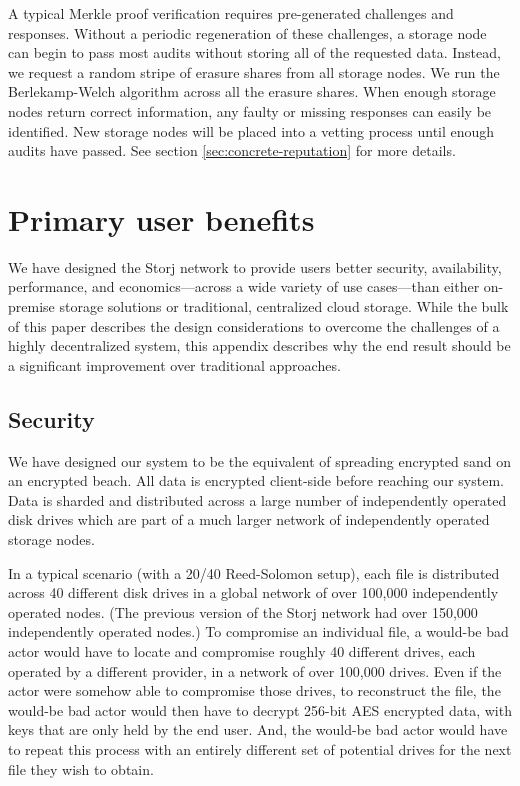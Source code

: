 \documentclass[8pt,fleqn,openany]{book}
\begin{document}
A typical Merkle proof verification requires pre-generated challenges and
responses.
Without a periodic regeneration of these challenges, a storage node can begin
to pass most audits without storing all of the requested data.
Instead, we request a random stripe of erasure shares from all storage nodes.
We run the Berlekamp-Welch algorithm\cite{bw} across all the
erasure shares.
When enough storage nodes return correct information, any faulty or missing
responses can easily be identified.
New storage nodes will be placed into a vetting process until enough audits
have passed.
See section \ref{sec:concrete-reputation} for more details.

\chapter{Primary user benefits}

We have designed the Storj network to provide users better security,
availability, performance, and economics---across a wide variety of use
cases---than either on-premise storage solutions or traditional, centralized
cloud storage. While the bulk of this paper describes the design considerations
to overcome the challenges of a highly decentralized system, this appendix
describes why the end result should be a significant improvement over
traditional approaches.

\section{Security}

We have designed our system to be the equivalent of spreading encrypted sand
on an encrypted beach. All data is encrypted client-side before reaching our
system. Data is sharded and distributed across a large number of independently
operated disk drives which are part of a much larger network of independently
operated storage nodes.

In a typical scenario (with a 20/40 Reed-Solomon
setup), each file is distributed across 40 different disk drives in a global
network of over 100,000 independently operated nodes. (The previous version of
the Storj network had over 150,000 independently operated nodes.) To compromise
an individual file, a would-be bad actor would have to locate and compromise
roughly 40 different drives, each operated by a different provider, in a
network of over 100,000 drives. Even if the actor were somehow able to
compromise those drives, to reconstruct the file, the would-be bad actor would
then have to decrypt 256-bit AES encrypted data, with keys that are only held
by the end user. And, the would-be bad actor would have to repeat this process
with an entirely different set of potential drives for the next file they wish
to obtain.
\end{document}
